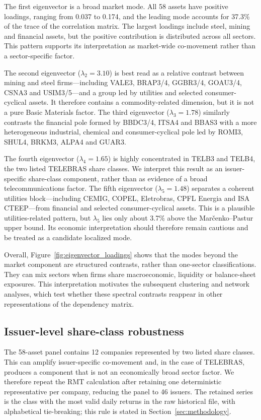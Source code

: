 The first eigenvector is a broad market mode. All 58 assets have positive loadings, ranging from 0.037 to 0.174, and the leading mode accounts for 37.3\% of the trace of the correlation matrix. The largest loadings include steel, mining and financial assets, but the positive contribution is distributed across all sectors. This pattern supports its interpretation as market-wide co-movement rather than a sector-specific factor.

The second eigenvector ($\lambda_2=3.10$) is best read as a relative contrast between mining and steel firms---including VALE3, BRAP3/4, GGBR3/4, GOAU3/4, CSNA3 and USIM3/5---and a group led by utilities and selected consumer-cyclical assets. It therefore contains a commodity-related dimension, but it is not a pure Basic Materials factor. The third eigenvector ($\lambda_3=1.78$) similarly contrasts the financial pole formed by BBDC3/4, ITSA4 and BBAS3 with a more heterogeneous industrial, chemical and consumer-cyclical pole led by ROMI3, SHUL4, BRKM3, ALPA4 and GUAR3.

The fourth eigenvector ($\lambda_4=1.65$) is highly concentrated in TELB3 and TELB4, the two listed TELEBRAS share classes. We interpret this result as an issuer-specific share-class component, rather than as evidence of a broad telecommunications factor. The fifth eigenvector ($\lambda_5=1.48$) separates a coherent utilities block---including CEMIG, COPEL, Eletrobras, CPFL Energia and ISA CTEEP---from financial and selected consumer-cyclical assets. This is a plausible utilities-related pattern, but $\lambda_5$ lies only about 3.7\% above the Mar\v{c}enko--Pastur upper bound. Its economic interpretation should therefore remain cautious and be treated as a candidate localized mode.

Overall, Figure~\ref{fig:eigenvector_loadings} shows that the modes beyond the market component are structured contrasts, rather than one-sector classifications. They can mix sectors when firms share macroeconomic, liquidity or balance-sheet exposures. This interpretation motivates the subsequent clustering and network analyses, which test whether these spectral contrasts reappear in other representations of the dependency matrix.

\subsection{Issuer-level share-class robustness}

The 58-asset panel contains 12 companies represented by two listed share classes. This can amplify issuer-specific co-movement and, in the case of TELEBRAS, produces a component that is not an economically broad sector factor. We therefore repeat the RMT calculation after retaining one deterministic representative per company, reducing the panel to 46 issuers. The retained series is the class with the most valid daily returns in the raw historical file, with alphabetical tie-breaking; this rule is stated in Section~\ref{sec:methodology}.

